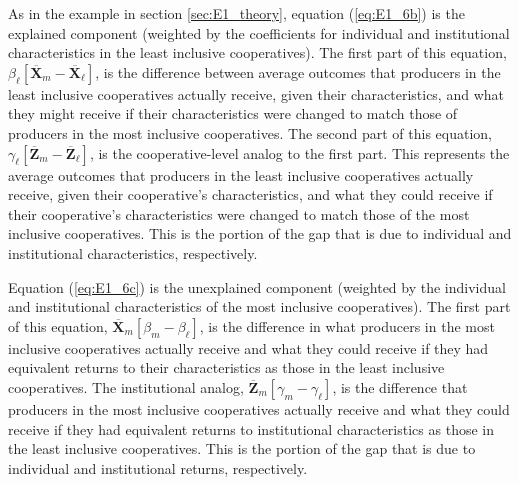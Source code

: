 \documentclass[11pt]{article}
\begin{document}
As in the example in section \ref{sec:E1_theory}, equation (\ref{eq:E1_6b}) is the explained component (weighted by the coefficients for individual and institutional characteristics in the least inclusive cooperatives). The first part of this equation, $\beta_{\ell}[\overline{\mathbf{X}}_{m} - \overline{\mathbf{X}}_{\ell}]$, is the difference between average outcomes that producers in the least inclusive cooperatives actually receive, given their characteristics, and what they might receive if their characteristics were changed to match those of producers in the most inclusive cooperatives. The second part of this equation, $\gamma_{\ell}[\overline{\mathbf{Z}}_{m} - \overline{\mathbf{Z}}_{\ell}]$, is the cooperative-level analog to the first part. This represents the average outcomes that producers in the least inclusive cooperatives actually receive, given their cooperative's characteristics, and what they could receive if their cooperative's characteristics were changed to match those of the most inclusive cooperatives. This is the portion of the gap that is due to individual and institutional characteristics, respectively.

Equation (\ref{eq:E1_6c}) is the unexplained component (weighted by the individual and institutional characteristics of the most inclusive cooperatives). The first part of this equation, $\overline{\mathbf{X}}_{m}[\beta_{m} - \beta_{\ell}]$, is the difference in what producers in the most inclusive cooperatives actually receive and what they could receive if they had equivalent returns to their characteristics as those in the least inclusive cooperatives. The institutional analog, $\overline{\mathbf{Z}}_{m}[\gamma_{m} - \gamma_{\ell}]$, is the difference that producers in the most inclusive cooperatives actually receive and what they could receive if they had equivalent returns to institutional characteristics as those in the least inclusive cooperatives. This is the portion of the gap that is due to individual and institutional returns, respectively.
\end{document}
